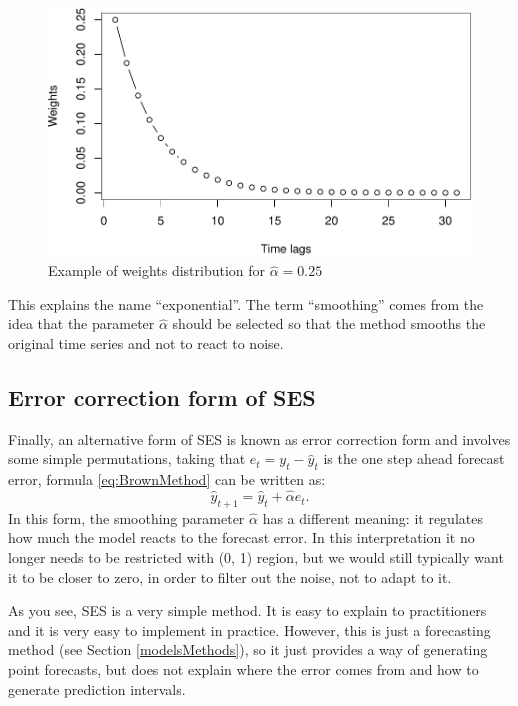 \documentclass[
]{book}
\theoremstyle{definition}
\theoremstyle{definition}
\theoremstyle{definition}
\theoremstyle{definition}
\theoremstyle{remark}
\begin{document}
\begin{figure}
\centering
\includegraphics{adam_files/figure-latex/BrownExponentialExample-1.pdf}
\caption{\label{fig:BrownExponentialExample}Example of weights distribution for \(\hat{\alpha}=0.25\)}
\end{figure}

This explains the name ``exponential''. The term ``smoothing'' comes from the idea that the parameter \(\hat{\alpha}\) should be selected so that the method smooths the original time series and not to react to noise.

\hypertarget{error-correction-form-of-ses}{%
\subsection{Error correction form of SES}\label{error-correction-form-of-ses}}

Finally, an alternative form of SES is known as error correction form and involves some simple permutations, taking that \(e_t=y_t-\hat{y}_t\) is the one step ahead forecast error, formula \eqref{eq:BrownMethod} can be written as:
\begin{equation}
  \hat{y}_{t+1} = \hat{y}_{t} + \hat{\alpha} e_{t}.
  \label{eq:SESErrorCorrection}
\end{equation}
In this form, the smoothing parameter \(\hat{\alpha}\) has a different meaning: it regulates how much the model reacts to the forecast error. In this interpretation it no longer needs to be restricted with (0, 1) region, but we would still typically want it to be closer to zero, in order to filter out the noise, not to adapt to it.

As you see, SES is a very simple method. It is easy to explain to practitioners and it is very easy to implement in practice. However, this is just a forecasting method (see Section \ref{modelsMethods}), so it just provides a way of generating point forecasts, but does not explain where the error comes from and how to generate prediction intervals.
\end{document}
